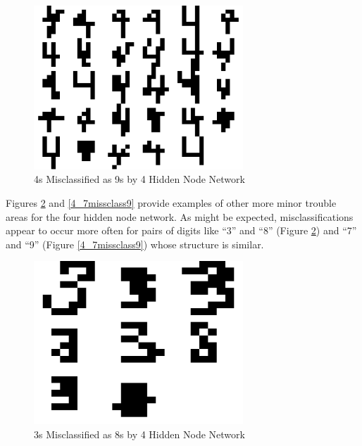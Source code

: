\documentclass{article}
\begin{document}
\begin{figure}
\centering
\includegraphics[width=0.7\textwidth]{data/final/4_test_4missclass9.png}
\caption{4s Misclassified as 9s by 4 Hidden Node Network}
\label{4_4missclass9}
\end{figure}

Figures \ref{4_3missclass8} and \ref{4_7missclass9} provide examples of other more minor trouble areas for the four hidden node network. As might be expected, misclassifications appear to occur more often for pairs of digits like ``3'' and ``8'' (Figure \ref{4_3missclass8}) and ``7'' and ``9'' (Figure \ref{4_7missclass9}) whose structure is similar.

\begin{figure}
\centering
\includegraphics[width=0.7\textwidth]{data/final/4_test_3missclass8.png}
\caption{3s Misclassified as 8s by 4 Hidden Node Network}
\label{4_3missclass8}
\end{figure}
\end{document}
